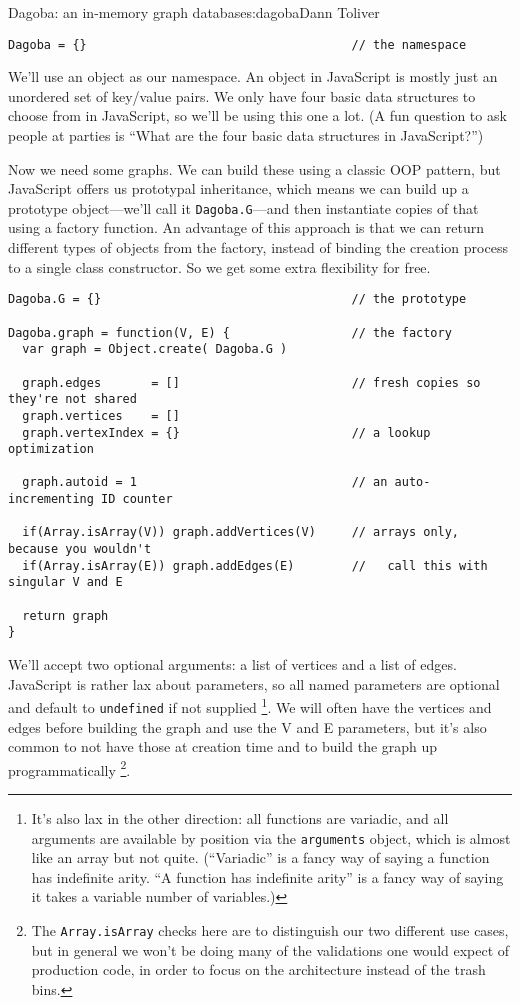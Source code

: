 \begin{aosachapter}{Dagoba: an in-memory graph database}{s:dagoba}{Dann Toliver}
\begin{verbatim}
Dagoba = {}                                     // the namespace
\end{verbatim}

We'll use an object as our namespace. An object in JavaScript is mostly
just an unordered set of key/value pairs. We only have four basic data
structures to choose from in JavaScript, so we'll be using this one a
lot. (A fun question to ask people at parties is ``What are the four
basic data structures in JavaScript?'')

Now we need some graphs. We can build these using a classic OOP pattern,
but JavaScript offers us prototypal inheritance, which means we can
build up a prototype object---we'll call it \texttt{Dagoba.G}---and then
instantiate copies of that using a factory function. An advantage of
this approach is that we can return different types of objects from the
factory, instead of binding the creation process to a single class
constructor. So we get some extra flexibility for free.

\begin{verbatim}
Dagoba.G = {}                                   // the prototype

Dagoba.graph = function(V, E) {                 // the factory
  var graph = Object.create( Dagoba.G )

  graph.edges       = []                        // fresh copies so they're not shared
  graph.vertices    = []
  graph.vertexIndex = {}                        // a lookup optimization

  graph.autoid = 1                              // an auto-incrementing ID counter

  if(Array.isArray(V)) graph.addVertices(V)     // arrays only, because you wouldn't
  if(Array.isArray(E)) graph.addEdges(E)        //   call this with singular V and E

  return graph
}
\end{verbatim}

We'll accept two optional arguments: a list of vertices and a list of
edges. JavaScript is rather lax about parameters, so all named
parameters are optional and default to \texttt{undefined} if not
supplied \footnote{It's also lax in the other direction: all functions
  are variadic, and all arguments are available by position via the
  \texttt{arguments} object, which is almost like an array but not
  quite. (``Variadic'' is a fancy way of saying a function has
  indefinite arity. ``A function has indefinite arity'' is a fancy way
  of saying it takes a variable number of variables.)}. We will often
have the vertices and edges before building the graph and use the V and
E parameters, but it's also common to not have those at creation time
and to build the graph up programmatically \footnote{The
  \texttt{Array.isArray} checks here are to distinguish our two
  different use cases, but in general we won't be doing many of the
  validations one would expect of production code, in order to focus on
  the architecture instead of the trash bins.}.


\end{aosachapter}

